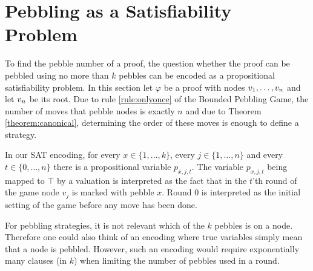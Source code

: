 \section{Pebbling as a Satisfiability Problem}
\label{sec:pebblingSAT}

To find the pebble number of a proof, the question whether the proof can be pebbled using no more than $k$ pebbles can be encoded as a propositional satisfiability problem.
In this section let $\varphi$ be a proof with nodes $v_1,\ldots,v_n$ and let $v_n$ be its root. 
Due to rule \ref{rule:onlyonce} of the Bounded Pebbling Game, the number of moves that pebble nodes is exactly $n$ and due to Theorem \ref{theorem:canonical}, determining the order of these moves is enough to define a strategy. 

In our SAT encoding, for every $x \in \{1,\ldots,k\}$, every $j \in \{1,\ldots,n\}$ and every $t \in \{0,\ldots,n\}$ there is a propositional variable $p_{x,j,t}$. 
The variable $p_{x,j,t}$ being mapped to $\top$ by a valuation is interpreted as the fact that in the $t$'th round of the game node $v_j$ is marked with pebble $x$.
Round $0$ is interpreted as the initial setting of the game before any move has been done.

For pebbling strategies, it is not relevant which of the $k$ pebbles is on a node.
Therefore one could also think of an encoding where true variables simply mean that a node is pebbled.
However, such an encoding would require exponentially many clauses (in $k$) when limiting the number of pebbles used in a round.

